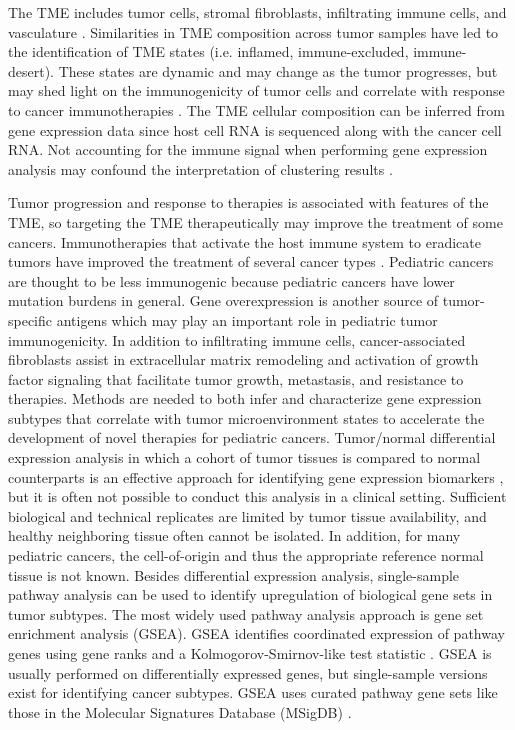 \documentclass[10pt,letterpaper]{article}
\begin{document}
The TME includes tumor cells, stromal fibroblasts, infiltrating immune cells, and vasculature \cite{joyceCellExclusionImmune2015}. Similarities in TME composition across tumor samples have led to the identification of TME states (i.e. inflamed, immune-excluded, immune-desert). These states are dynamic and may change as the tumor progresses, but may shed light on the immunogenicity of tumor cells and correlate with response to cancer immunotherapies \cite{chenElementsCancerImmunity2017}. The TME cellular composition can be inferred from gene expression data since host cell RNA is sequenced along with the cancer cell RNA. Not accounting for the immune signal when performing gene expression analysis may confound the interpretation of clustering results \cite{aranXCellDigitallyPortraying2017, rheeImpactTumorPurity2018, hoadleyCellofOriginPatternsDominate2018}.

Tumor progression and response to therapies is associated with features of the TME, so targeting the TME therapeutically may improve the treatment of some cancers. Immunotherapies that activate the host immune system to eradicate tumors have improved the treatment of several cancer types \cite{mellmanCancerImmunotherapyComes2011, pageImmuneModulationCancer2014}. Pediatric cancers are thought to be less immunogenic because pediatric cancers have lower mutation burdens in general. Gene overexpression is another source of tumor-specific antigens which may play an important role in pediatric tumor immunogenicity. In addition to infiltrating immune cells, cancer-associated fibroblasts assist in extracellular matrix remodeling and activation of growth factor signaling that facilitate tumor growth, metastasis, and resistance to therapies. Methods are needed to both infer and characterize gene expression subtypes that correlate with tumor microenvironment states to accelerate the development of novel therapies for pediatric cancers.
Tumor/normal differential expression analysis in which a cohort of tumor tissues is compared to normal counterparts is an effective approach for identifying gene expression biomarkers \cite{andersCountbasedDifferentialExpression2013, andersDifferentialExpressionAnalysis2010, sonesonComparisonMethodsDifferential2013}, but it is often not possible to conduct this analysis in a clinical setting. Sufficient biological and technical replicates are limited by tumor tissue availability, and healthy neighboring tissue often cannot be isolated. In addition, for many pediatric cancers, the cell-of-origin and thus the appropriate reference normal tissue is not known. Besides differential expression analysis, single-sample pathway analysis can be used to identify upregulation of biological gene sets in tumor subtypes. The most widely used pathway analysis approach is gene set enrichment analysis (GSEA). GSEA identifies coordinated expression of pathway genes using gene ranks and a Kolmogorov-Smirnov-like test statistic \cite{subramanianGeneSetEnrichment2005, moothaPGC1alpharesponsiveGenesInvolved2003}. GSEA is usually performed on differentially expressed genes, but single-sample versions exist for identifying cancer subtypes. GSEA uses curated pathway gene sets like those in the Molecular Signatures Database (MSigDB) \cite{liberzonMolecularSignaturesDatabase2011}.
 
\end{document}
